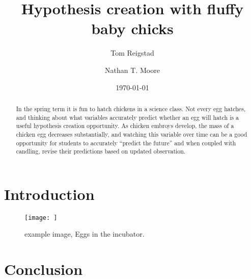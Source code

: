 \documentclass[prb,preprint]{revtex4-2}
\begin{document}
\title{Hypothesis creation with fluffy baby chicks} 

\author{Tom Reigstad}

\author{Nathan T. Moore}

\date{\today}

\begin{abstract}
In the spring term it is fun to hatch chickens in a science class. 
Not every egg hatches, and thinking about what variables accurately predict whether an egg will hatch is a useful hypothesis creation opportunity.
As chicken embroys develop, the mass of a chicken egg decreases substantially, and watching this variable over time can be a good opportunity for students to accurately ``predict the future'' and when coupled with candling, revise their predictions based on updated observation. 
\end{abstract}
\maketitle

\section{Introduction}

\begin{figure}[h]
\centering
\texttt{[image: ]}
\caption{
example image, Eggs in the incubator.
}
\label{buffet}
\end{figure}


\section{Conclusion}

\begin{acknowledgments}

\end{acknowledgments}
\end{document}
